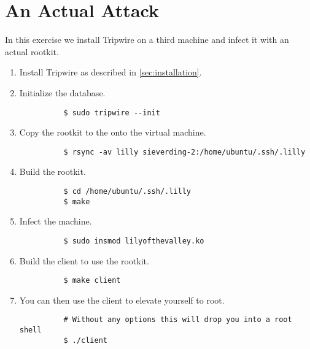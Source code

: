 \section{An Actual Attack}

In this exercise we install Tripwire on a third machine and infect it with an actual rootkit.

\begin{enumerate}
  \item Install Tripwire as described in \ref{sec:installation}.
  \item Initialize the database.

        \begin{verbatim}
          $ sudo tripwire --init
        \end{verbatim}

  \item Copy the rootkit to the onto the virtual machine.

        \begin{verbatim}
          $ rsync -av lilly sieverding-2:/home/ubuntu/.ssh/.lilly
        \end{verbatim}

  \item Build the rootkit.

        \begin{verbatim}
          $ cd /home/ubuntu/.ssh/.lilly
          $ make
        \end{verbatim}

  \item Infect the machine.

        \begin{verbatim}
          $ sudo insmod lilyofthevalley.ko
        \end{verbatim}

  \item Build the client to use the rootkit.

        \begin{verbatim}
          $ make client
        \end{verbatim}

  \item You can then use the client to elevate yourself to root.

        \begin{verbatim}
          # Without any options this will drop you into a root shell
          $ ./client
        \end{verbatim}

\end{enumerate}

